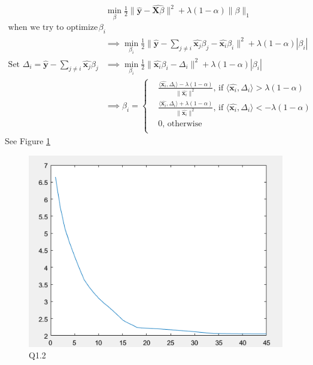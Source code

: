 \documentclass[11pt]{article}
\newcommand{\mtx}[1]{\mathbf{#1}}
\newcommand{\vct}[1]{\mathbf{#1}}
\def \mX {\mtx{X}}
\def \vx {\vct{x}}
\def \vy {\vct{y}}
\begin{document}
\begin{enumerate}
	\begin{align*}
		&\min_{\beta} \frac{1}{2} \|\hat{\vy}-\hat{\mX\beta}\|^2+\lambda(1-\alpha)\|\beta\|_1\\
		\text{when we try to optimize } \beta_i\\ 
		&\implies  \min_{\beta_i} \frac{1}{2}\|\hat{\vy}- \sum_{j\neq i}\hat{\vx_j}\beta_j-\hat{\vx_i}\beta_i\|^2+\lambda(1-\alpha)|\beta_i|\\
		\text{Set } \Delta_i = \hat{\vy}- \sum_{j\neq i}\hat{\vx_j}\beta_j 
		&\implies  \min_{\beta_i} \frac{1}{2}\|\hat{\vx_i}\beta_i-\Delta_i\|^2+\lambda(1-\alpha)|\beta_i|\\
		&\implies \beta_i = 
		\left\{ \begin{aligned} 
			&\frac{\langle\hat{\vx_i},\Delta_i\rangle-\lambda(1-\alpha)}{\|\hat{\vx_i}\|^2}\text{, if } \langle\hat{\vx_i},\Delta_i\rangle>\lambda(1-\alpha)\\
			&\frac{\langle\hat{\vx_i},\Delta_i\rangle+\lambda(1-\alpha)}{\|\hat{\vx_i}\|^2}\text{, if } \langle\hat{\vx_i},\Delta_i\rangle<-\lambda(1-\alpha)\\
			&0 \text{, otherwise}\\ 
		  \end{aligned} \right.
	\end{align*}
	See Figure \ref{fig:Q1_2}
	\begin{figure}[h!]
		\centering
		\includegraphics[width=0.5\linewidth]{Q1_2.png}
		\caption{Q1.2}
		\label{fig:Q1_2}
	\end{figure}

\end{enumerate}
	

\newpage
\end{document}
